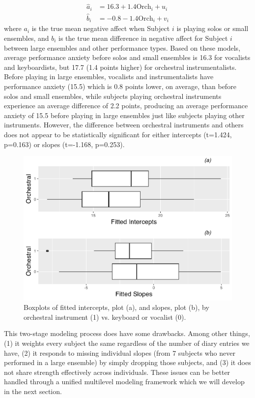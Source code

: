 \documentclass[
]{krantz}
\begin{document}
\begin{align}
\hat{a}_{i} & = 16.3+1.4\textrm{Orch}_{i}+u_{i}
\label{eq:level2s0hat}  \\
\hat{b}_{i} & = -0.8-1.4\textrm{Orch}_{i}+v_{i}
\nonumber
\end{align}
where \(a_{i}\) is the true mean negative affect when Subject \(i\) is playing solos or small ensembles, and \(b_{i}\) is the true mean difference in negative affect for Subject \(i\) between large ensembles and other performance types. Based on these models, average performance anxiety before solos and small ensembles is 16.3 for vocalists and keyboardists, but 17.7 (1.4 points higher) for orchestral instrumentalists. Before playing in large ensembles, vocalists and instrumentalists have performance anxiety (15.5) which is 0.8 points lower, on average, than before solos and small ensembles, while subjects playing orchestral instruments experience an average difference of 2.2 points, producing an average performance anxiety of 15.5 before playing in large ensembles just like subjects playing other instruments. However, the difference between orchestral instruments and others does not appear to be statistically significant for either intercepts (t=1.424, p=0.163) or slopes (t=-1.168, p=0.253).

\begin{figure}

{\centering \includegraphics[width=0.6\linewidth]{bookdown-BeyondMLR_files/figure-latex/mli-boxmat2-1} 

}

\caption{Boxplots of fitted intercepts, plot (a), and slopes, plot (b), by orchestral instrument (1) vs. keyboard or vocalist (0).}\label{fig:mli-boxmat2}
\end{figure}

This two-stage modeling process does have some drawbacks. Among other things, (1) it weights every subject the same regardless of the number of diary entries we have, (2) it responds to missing individual slopes (from 7 subjects who never performed in a large ensemble) by simply dropping those subjects, and (3) it does not share strength effectively across individuals. These issues can be better handled through a unified multilevel modeling framework which we will develop in the next section.
\end{document}
